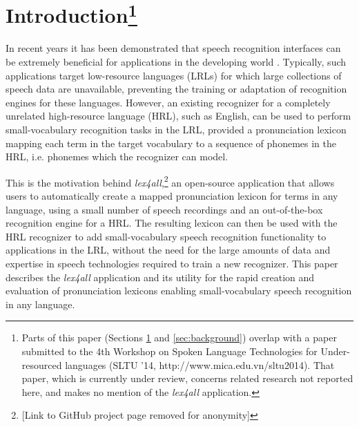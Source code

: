 \documentclass[11pt]{article}
\begin{document}
\section{Introduction\footnote{Parts of this paper (Sections \ref{sec:intro} and \ref{sec:background}) overlap with a paper submitted to the 4th Workshop on Spoken Language Technologies for Under-resourced languages (SLTU '14, http://www.mica.edu.vn/sltu2014). That paper, which is currently under review, concerns related research not reported here, and makes no mention of the \textit{lex4all} application.}}
\label{sec:intro}

In recent years it has been demonstrated that speech recognition interfaces can be extremely beneficial for applications in the developing world
 \cite{case4st4d,Sherwani09,bali13}. 
Typically, 
such applications target low-resource languages (LRLs) for which large collections of speech data are unavailable, preventing the training or adaptation of recognition engines for these languages.
However, 
an existing recognizer for a completely unrelated high-resource language (HRL), such as English, can be used to perform small-vocabulary recognition tasks in the LRL,
provided a pronunciation lexicon mapping each term in the target vocabulary to a sequence of phonemes in the HRL, i.e. phonemes which the recognizer can model. 

This is the motivation behind \textit{lex4all},\footnote{[Link to GitHub project page removed for anonymity]} an open-source application that allows users to automatically create a mapped pronunciation lexicon for terms in any language, using a small number of speech recordings and an out-of-the-box recognition engine for a HRL. The resulting lexicon can then be used with the HRL recognizer to add small-vocabulary speech recognition functionality to applications in the LRL, without the need for the large amounts of data and expertise in speech technologies required to train a new recognizer. This paper describes the \textit{lex4all} application and its utility for the rapid
creation and evaluation of pronunciation lexicons enabling small-vocabulary speech recognition in any language.
\end{document}
